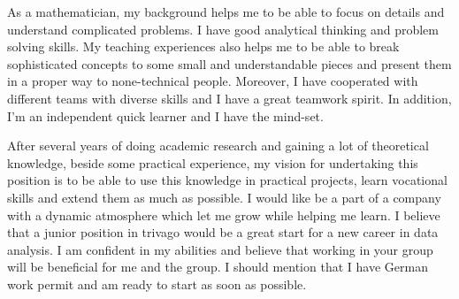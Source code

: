 \documentclass[12pt,a4paper,sans]{moderncv}        %
\begin{document}




As a mathematician, my background helps me to be able to focus on details and understand complicated problems. I have good analytical thinking and problem solving skills. My teaching experiences also helps me to be able to break sophisticated concepts to some small and understandable pieces and present them in a proper way to none-technical people. Moreover, I have cooperated with different teams with diverse skills and I have a great teamwork spirit. In addition, I’m an independent quick learner and I have the mind-set. 


After several years of doing academic research and gaining a lot of theoretical knowledge, beside some practical experience, my vision for undertaking this position is to be able to use this knowledge in practical projects, learn vocational skills and extend them as much as possible. I would like be a part of  a company with a dynamic atmosphere which let me grow while helping me learn. I believe that a junior position in trivago would be a great start for a new career in data analysis. I am confident in my abilities and believe that working in your group will be beneficial for me and the group. I should mention that I have German work permit and am ready to start as soon as possible.

 \vspace{3mm}
 
\makeletterclosing
\end{document}

